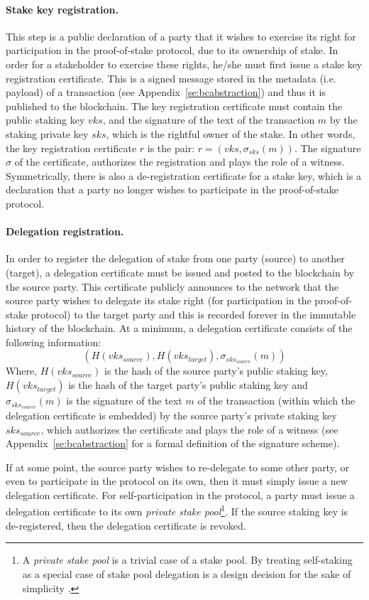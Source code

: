 \documentclass[11pt,a4paper]{article}
\begin{document}
\paragraph{Stake key registration.}
This step is a public declaration of a party that it wishes to exercise its
right for participation in the proof-of-stake protocol, due to its ownership of
stake. In order for a stakeholder to exercise these rights, he/she must first
issue a stake key registration certificate. This is a signed message stored in
the metadata (i.e. payload) of a transaction (see
Appendix~\ref{se:bcabstraction}) and thus it is published to the blockchain. The
key registration certificate must contain the public staking key $vks$, and the
signature of the text of the transaction $m$ by the staking private key $sks$,
which is the rightful owner of the stake. In other words, the key registration
certificate $r$ is the pair: $r = (vks, \sigma_{sks}(m))$. The signature
$\sigma$ of the certificate, authorizes the registration and plays the role of a
witness.
%
Symmetrically, there is also a de-registration certificate for a stake key,
which is a declaration that a party no longer wishes to participate in the
proof-of-stake protocol.

\paragraph{Delegation registration.}
In order to register the delegation of stake from one party (source) to another
(target), a delegation certificate must be issued and posted to the blockchain
by the source party. This certificate publicly announces to the network that the
source party wishes to delegate its stake right (for participation in the
proof-of-stake protocol) to the target party and this is recorded forever in the
immutable history of the blockchain. At a minimum, a delegation certificate
consists of the following information:
$$
(H(vks_{source}), H(vks_{target}), \sigma_{sks_{source}}(m))
$$
Where, $H(vks_{source})$ is the hash of the source party's public staking key,
$H(vks_{target})$ is the hash of the target party's public staking key and
$\sigma_{sks_{source}}(m)$ is the signature of the text $m$ of the transaction
(within which the delegation certificate is embedded) by the source party's
private staking key $sks_{source}$, which authorizes the certificate and plays
the role of a witness (see Appendix~\ref{se:bcabstraction} for a formal
definition of the signature scheme).

If at some point, the source party wishes to re-delegate to some other party, or
even to participate in the protocol on its own, then it must simply issue a new
delegation certificate. For self-participation in the protocol, a party must
issue a delegation certificate to its own \emph{private stake pool}\footnote{A
  \emph{private stake pool} is a trivial case of a stake pool. By treating
  self-staking as a special case of stake pool delegation is a design decision
  for the sake of simplicity \cite{deldesign}.}. If the source staking key is
de-registered, then the delegation certificate is revoked.
\end{document}
